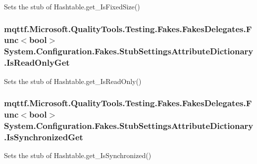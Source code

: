Sets the stub of Hashtable.\-get\-\_\-\-Is\-Fixed\-Size()

\hypertarget{class_system_1_1_configuration_1_1_fakes_1_1_stub_settings_attribute_dictionary_a0a3f6d7235ef0167044de808f9f2d52e}{
\subsubsection[{Is\-Read\-Only\-Get}]{\setlength{\rightskip}{0pt plus 5cm}mqttf.\-Microsoft.\-Quality\-Tools.\-Testing.\-Fakes.\-Fakes\-Delegates.\-Func$<$bool$>$ System.\-Configuration.\-Fakes.\-Stub\-Settings\-Attribute\-Dictionary.\-Is\-Read\-Only\-Get}}\label{class_system_1_1_configuration_1_1_fakes_1_1_stub_settings_attribute_dictionary_a0a3f6d7235ef0167044de808f9f2d52e}


Sets the stub of Hashtable.\-get\-\_\-\-Is\-Read\-Only()

\hypertarget{class_system_1_1_configuration_1_1_fakes_1_1_stub_settings_attribute_dictionary_a6901c41081a9838488c18b4675c11649}{
\subsubsection[{Is\-Synchronized\-Get}]{\setlength{\rightskip}{0pt plus 5cm}mqttf.\-Microsoft.\-Quality\-Tools.\-Testing.\-Fakes.\-Fakes\-Delegates.\-Func$<$bool$>$ System.\-Configuration.\-Fakes.\-Stub\-Settings\-Attribute\-Dictionary.\-Is\-Synchronized\-Get}}\label{class_system_1_1_configuration_1_1_fakes_1_1_stub_settings_attribute_dictionary_a6901c41081a9838488c18b4675c11649}


Sets the stub of Hashtable.\-get\-\_\-\-Is\-Synchronized()

